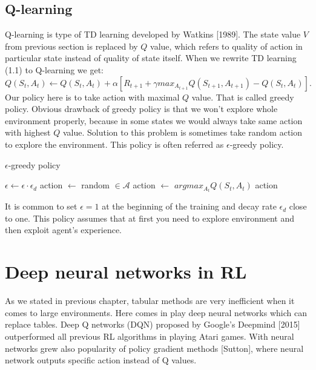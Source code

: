 \section{Q-learning}
Q-learning is type of TD learning developed by Watkins [1989]. The state value $V$ from previous section is replaced by $Q$ value, which refers to quality of action in particular state instead of quality of state itself. When we rewrite TD learning (1.1) to Q-learning we get:
\begin{equation}
Q(S_t, A_t) \gets Q(S_t, A_t) + \alpha [R_{t+1} + \gamma max_{A_{t+1}} Q(S_{t+1}, A_{t+1}) - Q(S_t, A_t)].
\end{equation}
Our policy here is to take action with maximal $Q$ value. That is called greedy policy. Obvious drawback of greedy policy is that we won't explore whole environment properly, because in some states we would always take same action with highest $Q$ value. Solution to this problem is sometimes take random action to explore the environment. This policy is often referred as $\epsilon$-greedy policy.

\begin{algorithm}
\caption{$\epsilon$-greedy policy}\label{euclid}
\begin{algorithmic}[1]
\State $\epsilon \gets \epsilon \cdot \epsilon_d$
\State action $\gets$ random $\in \mathcal{A}$
\Else 
\State action $\gets$ $argmax_{A_t} Q(S_t, A_t)$
\EndIf
\State \Return action
\EndProcedure
\end{algorithmic}
\end{algorithm}

It is common to set $\epsilon = 1$ at the beginning of the training and decay rate $\epsilon_d$ close to one. This policy assumes that at first you need to explore environment and then exploit agent's experience.

\chapter{Deep neural networks in RL}
As we stated in previous chapter, tabular methods are very inefficient when it comes to large environments. Here comes in play deep neural networks which can replace tables. Deep Q networks (DQN) proposed by Google's Deepmind [2015] outperformed all previous RL algorithms in playing Atari games. With neural networks grew also popularity of policy gradient methods [Sutton], where neural network outputs specific action instead of Q values.

